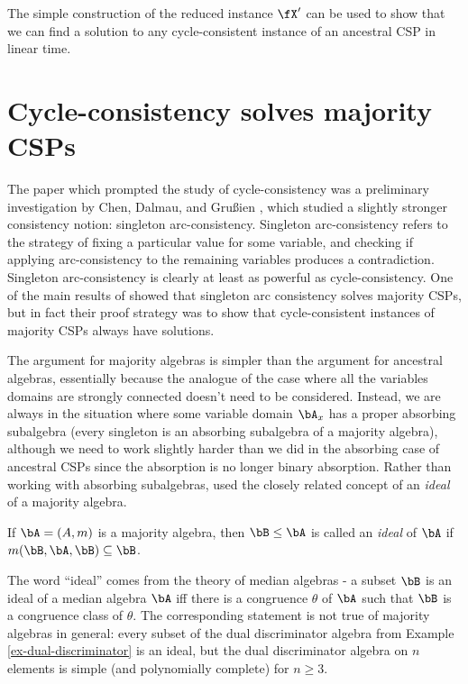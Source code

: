 The simple construction of the reduced instance $\fX'$ can be used to show that we can find a solution to any cycle-consistent instance of an ancestral CSP in linear time.


\section{Cycle-consistency solves majority CSPs}

The paper which prompted the study of cycle-consistency was a preliminary investigation by Chen, Dalmau, and Gru{\ss}ien \cite{arc}, which studied a slightly stronger consistency notion: singleton arc-consistency. Singleton arc-consistency refers to the strategy of fixing a particular value for some variable, and checking if applying arc-consistency to the remaining variables produces a contradiction. Singleton arc-consistency is clearly at least as powerful as cycle-consistency. One of the main results of \cite{arc} showed that singleton arc consistency solves majority CSPs, but in fact their proof strategy was to show that cycle-consistent instances of majority CSPs always have solutions.

The argument for majority algebras is simpler than the argument for ancestral algebras, essentially because the analogue of the case where all the variables domains are strongly connected doesn't need to be considered. Instead, we are always in the situation where some variable domain $\bA_x$ has a proper absorbing subalgebra (every singleton is an absorbing subalgebra of a majority algebra), although we need to work slightly harder than we did in the absorbing case of ancestral CSPs since the absorption is no longer binary absorption. Rather than working with absorbing subalgebras, \cite{arc} used the closely related concept of an \emph{ideal} of a majority algebra.

\begin{defn} If $\bA = (A,m)$ is a majority algebra, then $\bB \le \bA$ is called an \emph{ideal} of $\bA$ if $m(\bB,\bA,\bB) \subseteq \bB$.
\end{defn}

The word ``ideal'' comes from the theory of median algebras - a subset $\bB$ is an ideal of a median algebra $\bA$ iff there is a congruence $\theta$ of $\bA$ such that $\bB$ is a congruence class of $\theta$. The corresponding statement is not true of majority algebras in general: every subset of the dual discriminator algebra from Example \ref{ex-dual-discriminator} is an ideal, but the dual discriminator algebra on $n$ elements is simple (and polynomially complete) for $n \ge 3$.

